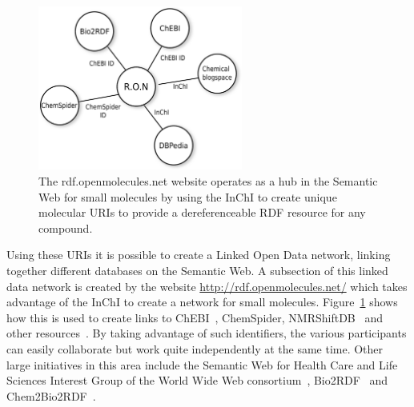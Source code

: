 \documentclass[11pt]{book}
\begin{document}
\begin{figure}[bt]
\begin{center}
\includegraphics[width=0.6\textwidth]{graphics/ons.pdf}
\end{center}
\caption{The rdf.openmolecules.net website operates as a hub
in the Semantic Web for small molecules by using the InChI
to create unique molecular URIs to provide a dereferenceable
RDF resource for any compound.}
\label{fig:ons}
\end{figure}

Using these URIs it is possible to create a Linked Open Data
network, linking together different databases on the
Semantic Web. A subsection of this linked data network
is created by the website \url{http://rdf.openmolecules.net/}
which takes advantage of the InChI to create a network for
small molecules. Figure~\ref{fig:ons} shows how this is used
to create links to ChEBI~\cite{Degtyarenko2008}, ChemSpider,
NMRShiftDB~\cite{Steinbeck2003b} and other
resources~\cite{Willighagen2010jbiomedsem}. By taking
advantage of such identifiers, the various participants
can easily collaborate but work quite independently at the
same time. Other large initiatives in this area include
the Semantic Web for Health Care and Life Sciences Interest Group of the
World Wide Web consortium~\cite{hclsig},
Bio2RDF~\cite{Belleau2008} and Chem2Bio2RDF~\cite{Chen2010}.
\end{document}
